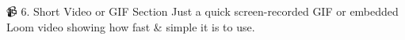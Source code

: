 



























📹 6. Short Video or GIF Section
Just a quick screen-recorded GIF or embedded Loom video showing how fast & simple it is to use.

